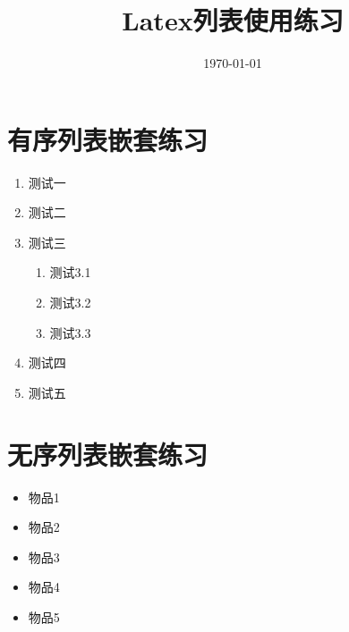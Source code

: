 \documentclass[UTF8]{article}
\title{Latex列表使用练习}
\date{\today}
\begin{document}
\maketitle
\section{有序列表嵌套练习}

\begin{enumerate}
    \item 测试一
    \item 测试二
    \item 测试三
    \begin{enumerate}
        \item 测试3.1
        \item 测试3.2
        \item 测试3.3
    \end{enumerate}
    \item 测试四
    \item 测试五
\end{enumerate}

\section{无序列表嵌套练习}
\begin{itemize}
    \item 物品1
    \item 物品2
    \item 物品3
    \item 物品4
    \item 物品5
\end{itemize}
\end{document}
